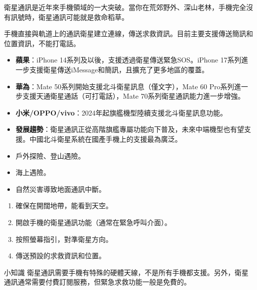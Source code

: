 


衛星通訊是近年來手機領域的一大突破。當你在荒郊野外、深山老林，手機完全沒有訊號時，衛星通訊可能就是救命稻草。


手機直接與軌道上的通訊衛星建立連線，傳送求救資訊。目前主要支援傳送簡訊和位置資訊，不能打電話。


\begin{itemize}
  \item \textbf{蘋果}：iPhone 14系列及以後，支援透過衛星傳送緊急SOS。iPhone 17系列進一步支援衛星傳送iMessage和簡訊，且擴充了更多地區的覆蓋。
  \item \textbf{華為}：Mate 50系列開始支援北斗衛星訊息（僅文字），Mate 60 Pro系列進一步支援天通衛星通話（可打電話），Mate 70系列衛星通訊能力進一步增強。
  \item \textbf{小米/OPPO/vivo}：2024年起旗艦機型陸續支援北斗衛星訊息功能。
  \item \textbf{發展趨勢}：衛星通訊正從高階旗艦專屬功能向下普及，未來中端機型也有望支援。中國北斗衛星系統在國產手機上的支援最為廣泛。
\end{itemize}


\begin{itemize}
  \item 戶外探險、登山遇險。
  \item 海上遇險。
  \item 自然災害導致地面通訊中斷。
\end{itemize}


\begin{enumerate}
  \item 確保在開闊地帶，能看到天空。
  \item 開啟手機的衛星通訊功能（通常在緊急呼叫介面）。
  \item 按照螢幕指引，對準衛星方向。
  \item 傳送預設的求救資訊和位置。
\end{enumerate}

\begin{tcbinfo}{小知識}
衛星通訊需要手機有特殊的硬體天線，不是所有手機都支援。另外，衛星通訊通常需要付費訂閱服務，但緊急求救功能一般是免費的。

\end{tcbinfo}

